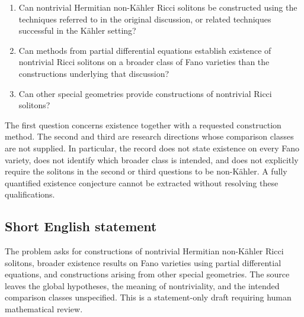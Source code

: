 \documentclass[11pt]{article}
\begin{document}
\begin{enumerate}
\item Can nontrivial Hermitian non-K\"ahler Ricci solitons be constructed using the techniques referred to in the original discussion, or related techniques successful in the K\"ahler setting?
\item Can methods from partial differential equations establish existence of nontrivial Ricci solitons on a broader class of Fano varieties than the constructions underlying that discussion?
\item Can other special geometries provide constructions of nontrivial Ricci solitons?
\end{enumerate}
The first question concerns existence together with a requested construction method. The second and third are research directions whose comparison classes are not supplied. In particular, the record does not state existence on every Fano variety, does not identify which broader class is intended, and does not explicitly require the solitons in the second or third questions to be non-K\"ahler. A fully quantified existence conjecture cannot be extracted without resolving these qualifications.
\subsection{Short English statement}
The problem asks for constructions of nontrivial Hermitian non-K\"ahler Ricci solitons, broader existence results on Fano varieties using partial differential equations, and constructions arising from other special geometries. The source leaves the global hypotheses, the meaning of nontriviality, and the intended comparison classes unspecified. This is a statement-only draft requiring human mathematical review.
\end{document}
